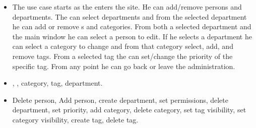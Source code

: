 \begin{itemize}
\item{} The use case starts as the \sadmin{} enters the site. He can add/remove persons and departments. The \sadmin{} can select departments and from the selected department he can add or remove \staff[]s and categories. From both a selected department and the main window he can select a person to edit. 
If he selects a department he can select a category to change and from that category select, add, and remove tags. 
From a selected tag the \sadmin{} can set/change the priority of the specific tag. From any point he can go back or leave the administration. 

\item{} \staff[c], \client[c], category, tag, department.

\item{} Delete person, Add person, create department, set permissions, delete department, set priority, add category, delete category, set tag visibility, set category visibility, create tag, delete tag.
\end{itemize}

